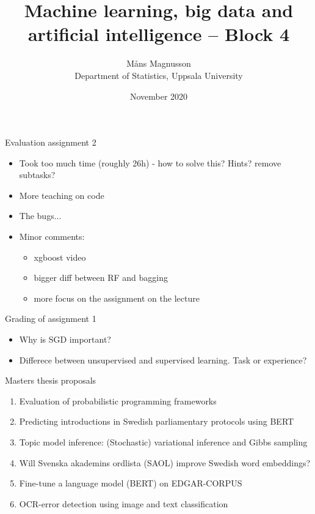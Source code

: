 \documentclass[10pt]{beamer}
\title[]{{\color{black}Machine learning, big data and artificial intelligence -- Block 4}}
\author[]{M{\aa}ns Magnusson\\Department of Statistics, Uppsala University}
\date{November 2020}
\begin{document}
\frame{\titlepage
}






\begin{frame}{Evaluation assignment 2}
\begin{itemize}
\item Took too much time (roughly 26h) - how to solve this? Hints? remove subtasks?
\item More teaching on code
\item The bugs...
\item Minor comments:
\begin{itemize}
\item xgboost video
\item bigger diff between RF and bagging
\item more focus on the assignment on the lecture
\end{itemize}
\end{itemize}
\end{frame}

\begin{frame}{Grading of assignment 1}
\begin{itemize}
\item Why is SGD important?
\item Differece between unsupervised and supervised learning. Task or experience?
\end{itemize}
\end{frame}

\begin{frame}{Masters thesis proposals}
\begin{enumerate}
\item Evaluation of probabilistic programming frameworks
\item Predicting introductions in Swedish parliamentary protocols using BERT
\item Topic model inference: (Stochastic) variational inference and Gibbs sampling
\item Will Svenska akademins ordlista (SAOL) improve Swedish word embeddings?
\item Fine-tune a language model (BERT) on EDGAR-CORPUS
\item OCR-error detection using image and text classification
\end{enumerate}
\end{frame}
\end{document}
